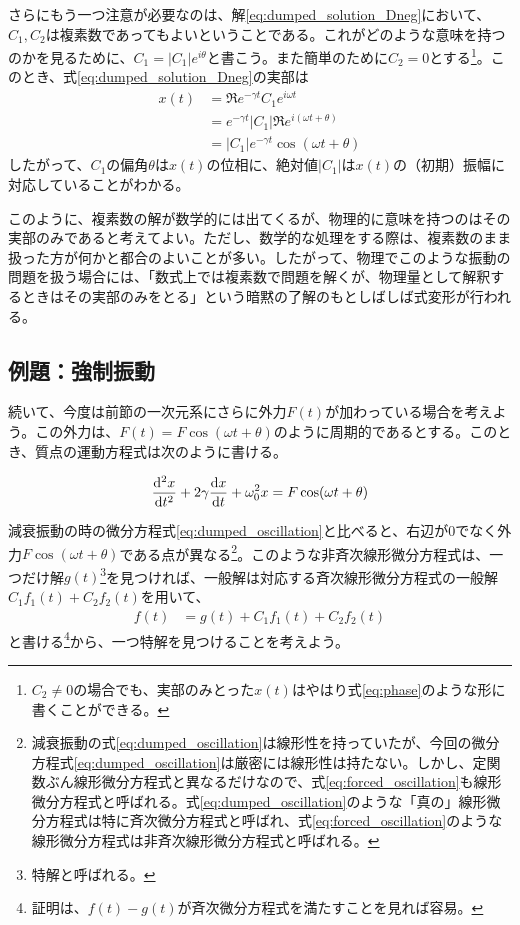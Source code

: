 \documentclass[uplatex,dvipdfmx]{jsarticle}
\begin{document}
さらにもう一つ注意が必要なのは、解\eqref{eq:dumped_solution_Dneg}において、$C_1, C_2$は複素数であってもよいということである。これがどのような意味を持つのかを見るために、$C_1 = |C_1|e^{i\theta}$と書こう。また簡単のために$C_2 = 0$とする\footnote{$C_2 \neq 0$の場合でも、実部のみとった$x(t)$はやはり式\eqref{eq:phase}のような形に書くことができる。}。このとき、式\eqref{eq:dumped_solution_Dneg}の実部は
\begin{align}
	x(t) &= \Re{e^{-\gamma t}C_1 e^{i\omega t}} \nonumber \\
		&= e^{-\gamma t}|C_1|\Re{e^{i(\omega t + \theta)}} \nonumber \\
		&= |C_1| e^{-\gamma t} \cos(\omega t + \theta) \label{eq:phase}
\end{align}
したがって、$C_1$の偏角$\theta$は$x(t)$の位相に、絶対値$|C_1|$は$x(t)$の（初期）振幅に対応していることがわかる。

このように、複素数の解が数学的には出てくるが、物理的に意味を持つのはその実部のみであると考えてよい。ただし、数学的な処理をする際は、複素数のまま扱った方が何かと都合のよいことが多い。したがって、物理でこのような振動の問題を扱う場合には、「数式上では複素数で問題を解くが、物理量として解釈するときはその実部のみをとる」という暗黙の了解のもとしばしば式変形が行われる。

\subsection{例題：強制振動}
続いて、今度は前節の一次元系にさらに外力$F(t)$が加わっている場合を考えよう。この外力は、$F(t)=F\cos (\omega t+\theta)$のように周期的であるとする。このとき、質点の運動方程式は次のように書ける。

\begin{align}
	\dv[2]{x}{t} + 2\gamma \dv{x}{t} + \omega_0^2 x = F\cos(\omega t+\theta) \label{eq:forced_oscillation}	
\end{align}

減衰振動の時の微分方程式\eqref{eq:dumped_oscillation}と比べると、右辺が$0$でなく外力$F\cos(\omega t + \theta)$である点が異なる\footnote{減衰振動の式\eqref{eq:dumped_oscillation}は線形性を持っていたが、今回の微分方程式\eqref{eq:dumped_oscillation}は厳密には線形性は持たない。しかし、定関数ぶん線形微分方程式と異なるだけなので、式\eqref{eq:forced_oscillation}も線形微分方程式と呼ばれる。式\eqref{eq:dumped_oscillation}のような「真の」線形微分方程式は特に斉次微分方程式と呼ばれ、式\eqref{eq:forced_oscillation}のような線形微分方程式は非斉次線形微分方程式と呼ばれる。}。このような非斉次線形微分方程式は、一つだけ解$g(t)$\footnote{特解と呼ばれる。}を見つければ、一般解は対応する斉次線形微分方程式の一般解$C_1f_1(t)+C_2f_2(t)$を用いて、
\begin{align}
	f(t) &= g(t) + C_1f_1(t)+C_2f_2(t)
\end{align}
と書ける\footnote{証明は、$f(t)-g(t)$が斉次微分方程式を満たすことを見れば容易。}から、一つ特解を見つけることを考えよう。
\end{document}
